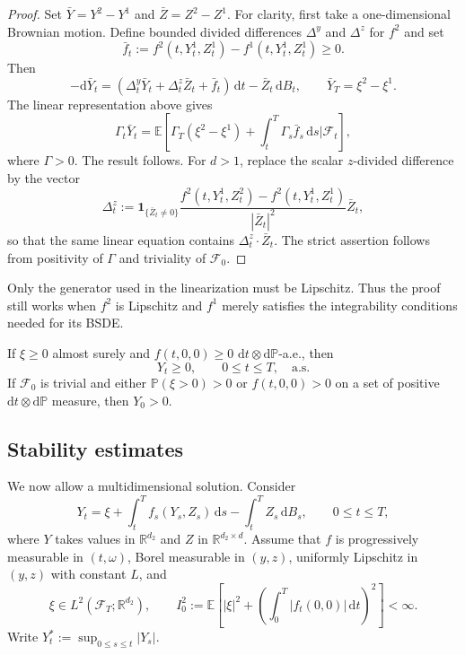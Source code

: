 \begin{proof}
Set $\bar Y=Y^2-Y^1$ and $\bar Z=Z^2-Z^1$.  For clarity, first take
a one-dimensional Brownian motion.  Define bounded divided differences
$\Delta^y$ and $\Delta^z$ for $f^2$ and set
\[
  \bar f_t:=f^2(t,Y_t^1,Z_t^1)-f^1(t,Y_t^1,Z_t^1)\ge0.
\]
Then
\[
  -\mathrm d\bar Y_t
  =(\Delta_t^y\bar Y_t+\Delta_t^z\bar Z_t+\bar f_t)\,\mathrm dt
   -\bar Z_t\,\mathrm dB_t,
  \qquad \bar Y_T=\xi^2-\xi^1.
\]
The linear representation above gives
\[
  \Gamma_t\bar Y_t
  =\mathbb E\!\left[
    \Gamma_T(\xi^2-\xi^1)+\int_t^T\Gamma_s\bar f_s\,\mathrm ds
    \mathrel{\big|}\mathcal F_t
  \right],
\]
where $\Gamma>0$.  The result follows.  For $d>1$, replace the scalar
$z$-divided difference by the vector
\[
  \Delta_t^z
  :=\mathbf 1_{\{\bar Z_t\ne0\}}
    \frac{f^2(t,Y_t^1,Z_t^2)-f^2(t,Y_t^1,Z_t^1)}{|\bar Z_t|^2}
    \bar Z_t,
\]
so that the same linear equation contains $\Delta_t^z\cdot\bar Z_t$.
The strict assertion follows from positivity of $\Gamma$ and triviality
of $\mathcal F_0$.
\end{proof}

\begin{remark}
Only the generator used in the linearization must be Lipschitz.  Thus the
proof still works when $f^2$ is Lipschitz and $f^1$ merely satisfies the
integrability conditions needed for its BSDE\@.
\end{remark}

\begin{cor}
If $\xi\ge0$ almost surely and
$f(t,0,0)\ge0$ $\mathrm dt\otimes\mathrm d\mathbb P$-a.e., then
\[
  Y_t\ge0,
  \qquad 0\le t\le T,
  \quad\text{a.s.}
\]
If $\mathcal F_0$ is trivial and either $\mathbb P(\xi>0)>0$ or
$f(t,0,0)>0$ on a set of positive
$\mathrm dt\otimes\mathrm d\mathbb P$ measure, then $Y_0>0$.
\end{cor}

\subsection{Stability estimates}

We now allow a multidimensional solution.  Consider
\[
  Y_t=\xi+\int_t^T f_s(Y_s,Z_s)\,\mathrm ds
      -\int_t^T Z_s\,\mathrm dB_s,
  \qquad 0\le t\le T,
\]
where $Y$ takes values in $\mathbb R^{d_2}$ and $Z$ in
$\mathbb R^{d_2\times d}$.  Assume that $f$ is progressively measurable
in $(t,\omega)$, Borel measurable in $(y,z)$, uniformly Lipschitz in
$(y,z)$ with constant $L$, and
\[
  \xi\in L^2(\mathcal F_T;\mathbb R^{d_2}),
  \qquad
  I_0^2:=\mathbb E\!\left[
    |\xi|^2+\left(\int_0^T|f_t(0,0)|\,\mathrm dt\right)^2
  \right]<\infty.
\]
Write $Y_t^*:=\sup_{0\le s\le t}|Y_s|$.

